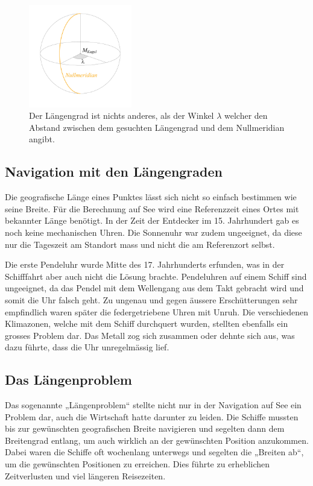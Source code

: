 \begin{refsection}
\begin{figure}[htbp]
\centering
\includegraphics[width=0.4\textwidth]{kugel/GeografischeLaenge.jpg}
\caption{Der Längengrad ist nichts anderes, als der Winkel $\lambda$  welcher den Abstand zwischen dem gesuchten Längengrad und dem Nullmeridian angibt.}
\end{figure}

\subsection{Navigation mit den Längengraden}
Die geografische Länge eines Punktes lässt sich nicht so einfach bestimmen wie seine Breite.
Für die Berechnung auf See wird eine Referenzzeit eines Ortes mit bekannter Länge benötigt.
In der Zeit der Entdecker im 15. Jahrhundert gab es noch keine mechanischen Uhren. Die Sonnenuhr war zudem ungeeignet, da diese nur die Tageszeit am Standort mass und nicht die am Referenzort selbst.

Die erste Pendeluhr wurde Mitte des 17. Jahrhunderts erfunden, was in der Schifffahrt aber auch nicht die Lösung brachte. Pendeluhren auf einem Schiff sind ungeeignet, da das Pendel mit dem Wellengang aus dem Takt gebracht wird und somit die Uhr falsch geht.
Zu ungenau und gegen äussere Erschütterungen sehr empfindlich waren später die federgetriebene Uhren mit Unruh. Die verschiedenen Klimazonen, welche mit dem Schiff durchquert wurden, stellten ebenfalls ein grosses Problem dar. Das Metall zog sich zusammen oder dehnte sich aus, was dazu führte, dass die Uhr unregelmässig lief.

\subsection{Das Längenproblem}
Das sogenannte „Längenproblem“ stellte nicht nur in der Navigation auf See ein Problem dar, auch die Wirtschaft hatte darunter zu leiden. Die Schiffe mussten bis zur gewünschten geografischen Breite navigieren und segelten dann dem Breitengrad entlang, um auch wirklich an der gewünschten Position anzukommen. Dabei waren die Schiffe oft wochenlang unterwegs und segelten die „Breiten ab“, um die gewünschten Positionen zu erreichen. Dies führte zu erheblichen Zeitverlusten und viel längeren Reisezeiten.



\end{refsection}
